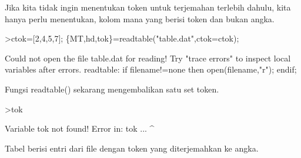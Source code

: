\documentclass[a4paper,10pt]{article}
\begin{document}
\begin{eulernotebook}
\begin{eulercomment}
\begin{eulercomment}
\begin{eulercomment}
\begin{eulercomment}
\begin{eulercomment}
\begin{eulercomment}
\begin{eulercomment}
\begin{eulercomment}
\begin{eulercomment}
\begin{eulercomment}
\begin{eulercomment}
\begin{eulercomment}
\begin{eulercomment}
\begin{eulercomment}
\begin{eulercomment}
\begin{eulercomment}
\begin{eulercomment}
\begin{eulercomment}
\begin{eulercomment}
Jika kita tidak ingin menentukan token untuk terjemahan terlebih
dahulu, kita hanya perlu menentukan, kolom mana yang berisi token dan
bukan angka.
\end{eulercomment}
\begin{eulerprompt}
>ctok=[2,4,5,7]; \{MT,hd,tok\}=readtable("table.dat",ctok=ctok);
\end{eulerprompt}
\begin{euleroutput}
  Could not open the file
  table.dat
  for reading!
  Try "trace errors" to inspect local variables after errors.
  readtable:
      if filename!=none then open(filename,"r"); endif;
\end{euleroutput}
\begin{eulercomment}
Fungsi readtable() sekarang mengembalikan satu set token.
\end{eulercomment}
\begin{eulerprompt}
>tok
\end{eulerprompt}
\begin{euleroutput}
  Variable tok not found!
  Error in:
  tok ...
     ^
\end{euleroutput}
\begin{eulercomment}
Tabel berisi entri dari file dengan token yang diterjemahkan ke angka.


\end{eulercomment}
\end{eulercomment}
\end{eulercomment}
\end{eulercomment}
\end{eulercomment}
\end{eulercomment}
\end{eulercomment}
\end{eulercomment}
\end{eulercomment}
\end{eulercomment}
\end{eulercomment}
\end{eulercomment}
\end{eulercomment}
\end{eulercomment}
\end{eulercomment}
\end{eulercomment}
\end{eulercomment}
\end{eulercomment}
\end{eulercomment}
\end{eulernotebook}
\end{document}
